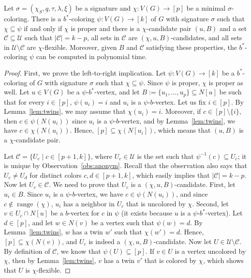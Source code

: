 \documentclass[runningheads, envcountsame]{llncs}
\newcommand{\sep}{\;|\;}
\newcommand{\seq}{\subseteq}
\newcommand{\ca}{\mathcal}
\DeclareMathOperator{\range}{range}
\begin{document}
\begin{lemma}\label{lem:find-coloring}
Let $\sigma = (\chi_S, q, \tau, \lambda, \xi)$ be a signature and $\chi\colon V(G) \rightarrow [p]$ be a minimal $\sigma$-coloring. There is a $b^*$-coloring $\psi\colon V(G) \rightarrow [k]$ of $G$ with signature $\sigma$ such that $\chi \seq \psi$ if and only if $\chi$ is proper and there is a $\chi$-candidate pair $(u, B)$ and a set $\ca C\seq\ca U$ such that $|\ca C| = k-p$, all sets in $\ca C$ are $(\chi, u, B)$-candidates, and all sets in $\ca U\setminus\ca C$ are $\chi$-flexible. Moreover, given $B$ and $\ca C$ satisfying these properties, the $b^*$-coloring $\psi$ can be computed in polynomial time.
\end{lemma}
\begin{proof}
First, we prove the left-to-right implication.
Let $\psi\colon V(G) \rightarrow [k]$ be a $b^*$-coloring of $G$ with signature $\sigma$ such that $\chi \seq \psi$. Since $\psi$ is proper, $\chi$ is proper as well.
Let $u \in V(G)$ be a $\psi$-$b^*$-vertex, and let $B := \{u_1, \ldots, u_p\} \seq N[u]$ be such that for every $i \in [p]$, $\psi(u_i) = i$ and $u_i$ is a $\psi$-$b$-vertex.
Let us fix $i \in [p]$.
By Lemma~\ref{lem:twins}, we may assume that $\chi(u_i) = i$.
Moreover, if $c \in [p] \setminus \{i\}$, then $c \in \psi(N(u_i))$ since $u_i$ is a $\psi$-$b$-vertex, and by Lemma~\ref{lem:twins}, we have $c \in \chi(N(u_i))$.
Hence, $[p] \seq \chi(N[u_i])$, which means that $(u, B)$ is a $\chi$-candidate pair.

Let $\ca C = \{U_c \sep c\in [p+1,k]\}$, where $U_c \in \ca U$ is the set such that $\psi^{-1}(c) \seq U_c$; it is unique by Observation~\ref{obs:anonym}.
Recall that the observation also says that $U_c\ne U_d$ for distinct colors $c,d\in[p+1,k]$, which easily implies that $|\ca C| = k-p$. Now let $U_c \in \ca C$. We need to prove that $U_c$ is a $(\chi, u, B)$-candidate.
First, let $u_i \in B$.
Since $u_i$ is a $\psi$-$b$-vertex, we have $c \in \psi(N(u_i))$, and since $c \notin \range(\chi)$, $u_i$ has a neighbor in $U_c$ that is uncolored by $\chi$.
Second, let $v \in U_c \cap N[u]$ be a $b$-vertex for $c$ in $\psi$ (it exists because $u$ is a $\psi$-$b^*$-vertex).
Let $d \in [p]$, and let $w \in N(v)$ be a vertex such that $\psi(w) = d$. By Lemma~\ref{lem:twins}, $w$ has a twin $w'$ such that $\chi(w') = d$. Hence, $[p] \seq \chi(N(v))$, and $U_c$ is indeed a $(\chi, u, B)$-candidate.
Now let $U \in \ca U\setminus\ca C$.
By definition of $\ca C$, we know that $\psi(U)\seq[p]$.
If $v \in U$ is a vertex uncolored by $\chi$, then by Lemma~\ref{lem:twins}, $v$ has a twin $v'$ that is colored by $\chi$, which shows that $U$ is $\chi$-flexible.


\end{proof}
\end{document}
